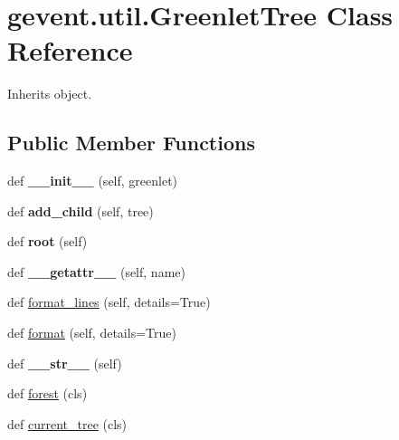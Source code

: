 \hypertarget{classgevent_1_1util_1_1_greenlet_tree}{}\section{gevent.\+util.\+Greenlet\+Tree Class Reference}
\label{classgevent_1_1util_1_1_greenlet_tree}


Inherits object.

\subsection*{Public Member Functions}
\begin{DoxyCompactItemize}
\item 
\mbox{\label{classgevent_1_1util_1_1_greenlet_tree_a72bf30cbc94e66cfb1704b6e3a181223}} 
def {\bfseries \+\_\+\+\_\+init\+\_\+\+\_\+} (self, greenlet)
\item 
\mbox{\label{classgevent_1_1util_1_1_greenlet_tree_a8eda397d222a22a35e1a40f6c9ef59c2}} 
def {\bfseries add\+\_\+child} (self, tree)
\item 
\mbox{\label{classgevent_1_1util_1_1_greenlet_tree_a29a0a8aac73470821c1e86cb93ad754c}} 
def {\bfseries root} (self)
\item 
\mbox{\label{classgevent_1_1util_1_1_greenlet_tree_a38488f2f84e2682f8393aa72de86bfcf}} 
def {\bfseries \+\_\+\+\_\+getattr\+\_\+\+\_\+} (self, name)
\item 
def \hyperlink{classgevent_1_1util_1_1_greenlet_tree_a969e680d518be73695f0a9fe9a736a0e}{format\+\_\+lines} (self, details=True)
\item 
def \hyperlink{classgevent_1_1util_1_1_greenlet_tree_a243660419ec4364558ef7d126bfb8647}{format} (self, details=True)
\item 
\mbox{\label{classgevent_1_1util_1_1_greenlet_tree_a87412844fab33375adb70080455f52d2}} 
def {\bfseries \+\_\+\+\_\+str\+\_\+\+\_\+} (self)
\item 
def \hyperlink{classgevent_1_1util_1_1_greenlet_tree_a9dd8412218ac48d66385728da4b60b4b}{forest} (cls)
\item 
def \hyperlink{classgevent_1_1util_1_1_greenlet_tree_a6c56ec6e4983c6a7046b1ace698a0a7d}{current\+\_\+tree} (cls)
\end{DoxyCompactItemize}
